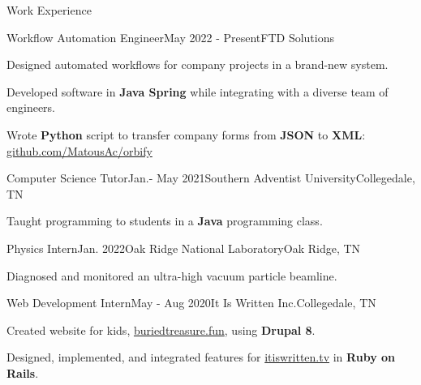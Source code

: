 \begin{rSection}{Work Experience}
	\begin{job}{Workflow Automation Engineer}{May 2022 - Present}{FTD Solutions}{}
		\item Designed automated workflows for company projects in a brand-new system.
		\item Developed software in {\bf Java Spring} while integrating with a diverse team of engineers.
		\item Wrote {\bf Python} script to transfer company forms from {\bf JSON} to {\bf XML}: \href{https://github.com/MatousAc/orbify}{github.com/MatousAc/orbify}
	\end{job}
	
	\begin{job}{Computer Science Tutor}{Jan.- May 2021}{Southern Adventist University}{Collegedale, TN}{}
	 \item Taught programming to students in a {\bf Java} programming class.
	\end{job}

	\begin{job}{Physics Intern}{Jan. 2022}{Oak Ridge National Laboratory}{Oak Ridge, TN}
	 \item Diagnosed and monitored an ultra-high vacuum particle beamline.
	\end{job}

	\begin{job}{Web Development Intern}{May - Aug 2020}{It Is Written Inc.}{Collegedale, TN}
		\item Created website for kids, \href{https://buriedtreasure.fun/}{buriedtreasure.fun}, using {\bf Drupal 8}.
		\item Designed, implemented, and integrated features for \href{https://itiswritten.tv}{itiswritten.tv} in {\bf Ruby on Rails}.
	\end{job}
\end{rSection}
